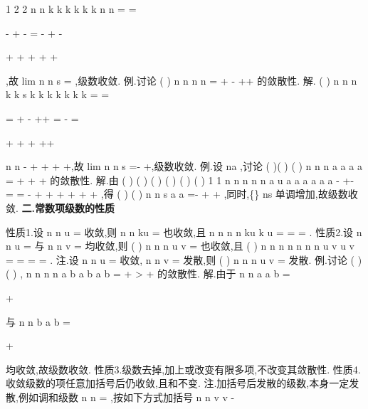 \sum 
\sum 
{} 1
2 2
n
n
k
k
k
k
k
k
n
n
=
=








-
+
-
=
-
+
-








+
+
+
+
+








\sum 
\sum 
,故 
lim
n
n
s
\to \infty 
=
,级数收敛. 
\textcolor{lyred}{例}.讨论
(
)
n
n
n
n
\infty 
=
+
-
++
\sum 
的敛散性. 
解.
(
)
n
n
n
k
k
s
k
k
k
k
k
k
k
=
=


=
+
-
++
=
-
=


+
+
+
++


\sum 
\sum 
n
n
-
+
+
+
+,故
lim
n
n
s
\to \infty 
=-
+,级数收敛. 
\textcolor{lyred}{例}.设
na \ge 
,讨论
(
)(
)
(
)
n
n
n
a
a
a
a
\infty 
=
+
+
+
\sum 
\Lambda 
的敛散性. 
解.由
(
)
(
)
(
)
(
)
(
)
(
)
1 1
n
n
n
n
n
a
u
a
a
a
a
a
a
-
+-
=
=
-
+
+
+
+
+
+
\Lambda 
\Lambda 
\Lambda 
,得 
(
)
(
)
n
n
s
a
a
=-
\le 
+
+
\Lambda 
,同时,\{\}
ns
单调增加,故级数收敛. 
\vspace{4pt}
{\bfseries \textcolor{lyred}{二.常数项级数的性质}}

\textcolor{lyred}{性质1}.设
n
n
u
\infty 
=\sum 
收敛,则
n
n
ku
\infty 
=\sum 
也收敛,且
n
n
n
n
ku
k
u
\infty 
\infty 
=
=
=
\sum 
\sum 
. 
\textcolor{lyred}{性质2}.设
n
n
u
\infty 
=\sum 
与
n
n
v
\infty 
=\sum 
均收敛,则
(
)
n
n
n
u
v
\infty 
=
\pm 
\sum 
也收敛,且 
(
)
n
n
n
n
n
n
n
u
v
u
v
\infty 
\infty 
\infty 
=
=
=
\pm 
=
\pm 
\sum 
\sum 
\sum 
. 
\textcolor{lyred}{注}.设
n
n
u
\infty 
=\sum 
收敛,
n
n
v
\infty 
=\sum 
发散,则
(
)
n
n
n
u
v
\infty 
=
\pm 
\sum 
发散. 
\textcolor{lyred}{例}.讨论
(
)
(
)
,
n
n
n
n
a
b
a b
a
b
\infty 
=
+
>
+
\sum 
的敛散性. 
解.由于
n
n
a
a
b
\infty 
=




+


\sum 
与
n
n
b
a
b
\infty 
=




+


\sum 
均收敛,故级数收敛. 
\textcolor{lyred}{性质3}.级数去掉,加上或改变有限多项,不改变其敛散性. 
\textcolor{lyred}{性质4}.收敛级数的项任意加括号后仍收敛,且和不变. 
\textcolor{lyred}{注}.加括号后发散的级数,本身一定发散,例如\textcolor{lyred}{调和级数}
n
n
\infty 
=\sum 
,按如下方式加括号 
n
n
v
v
-







